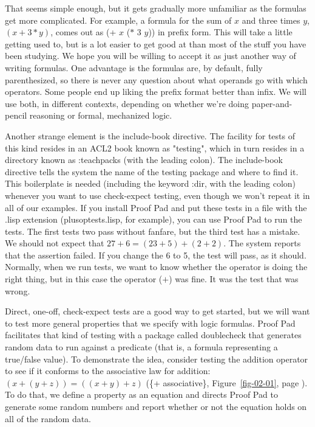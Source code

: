 That seems simple enough, but it gets gradually more unfamiliar
as the formulas get more complicated.
For example, a formula for the sum of $x$ and three times $y$, $(x + 3*y)$,
comes out as (+ $x$ ($*$ $3$ $y$)) in prefix form.
This will take a little getting used to,
but is a lot easier to get good at than
most of the stuff you have been studying.
We hope you will be willing to accept it as just another way of writing formulas.
One advantage is the formulas are, by default, fully parenthesized,
so there is never any question about what operands go with which operators.
Some people end up liking the prefix format better than infix.
We will use both, in different contexts, depending on whether
we're doing paper-and-pencil reasoning or formal, mechanized logic.

Another strange element is the include-book directive.
The facility for tests of this kind resides in an ACL2 book
known as "testing", which in turn resides in a directory known
as :teachpacks (with the leading colon). 
The include-book directive tells the system
the name of the testing package and where to find it. 
This boilerplate is needed (including the keyword :dir, with the leading colon)
whenever you want to use check-expect testing,
even though we won't repeat it in all of our examples.
If you install Proof Pad and put these tests in a file
with the .lisp extension (plusoptests.lisp, for example),
you can use Proof Pad to run the tests. 
The first tests two pass without fanfare,
but the third test has a mistake. 
We should not expect that $27 + 6 = (23 + 5) + (2 + 2)$.
The system reports that the assertion failed.
If you change the 6 to 5, the test will pass, as it should.
Normally, when we run tests, we want to know whether the
operator is doing the right thing, 
but in this case the operator ($+$) was fine.
It was the test that was wrong.

Direct, one-off, check-expect tests 
are a good way to get started, but 
we will want to test more general properties that we specify with logic formulas.
Proof Pad facilitates that kind of testing with a package called doublecheck
that generates random data to run against a predicate 
(that is, a formula representing a true/false value).
To demonstrate the idea, consider testing the addition operator to see if
it conforms to the associative law for addition: $(x + (y + z)) = ((x + y) + z)$
(\{+ associative\}, Figure~\ref{fig-02-01}, page \pageref{fig-02-01}).
To do that, we define a property as an equation
and directs Proof Pad to generate some random numbers and
report whether or not the equation holds on all of the random data.

